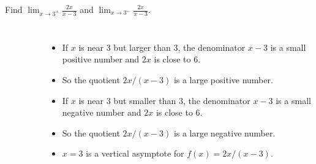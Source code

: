 \begin{frame}
\begin{example}[Example 1, p. 126]
Find $\lim_{x\rightarrow 3^+} \frac{2x}{x-3}$ and $\lim_{x\rightarrow 3^-}\frac{2x}{x-3}$.
\begin{columns}[c]
\ \ 

\ \ 

%
\begin{itemize}
\item<2->  If $x$ is near 3 but larger than 3, the denominator $x-3$ is a small positive number and $2x$ is close to 6.
\item<3->  So the quotient $2x/(x-3)$ is a large positive number.
\item<5->  If $x$ is near 3 but smaller than 3, the denominator $x-3$ is a small negative number and $2x$ is close to 6.
\item<6->  So the quotient $2x/(x-3)$ is a large negative number.
\item<8->  $x = 3$ is a vertical asymptote for $f(x) = 2x/(x-3)$.
\end{itemize}
\end{columns}
\end{example}
\end{frame}
